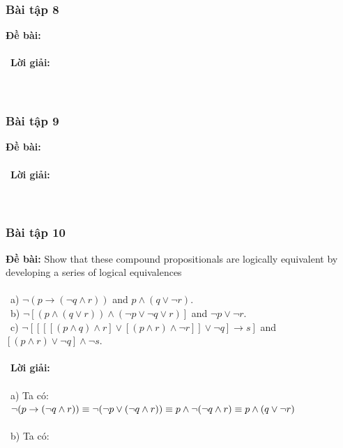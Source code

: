 \documentclass[a4paper]{article}
\begin{document}
\subsubsection{Bài tập 8}
\textbf{Đề bài:} 
\\\ \\\
\textbf{Lời giải:} \\\ \\\
\clearpage
\subsubsection{Bài tập 9}
\textbf{Đề bài:} 
\\\ \\\
\textbf{Lời giải:} \\\ \\\
\clearpage
\subsubsection{Bài tập 10}
\textbf{Đề bài: } Show that these compound propositionals are logically equivalent by developing a series of logical equivalences \\\ \\\
a) $\lnot(p\rightarrow (\lnot q \land r))$ and $p \land (q \lor \lnot r)$.\\\
b) $\lnot[(p \land (q\lor r)) \land (\lnot p \lor \lnot q \lor r)]$ and $\lnot p \lor \lnot r$. \\\
c) $\lnot [[[[(p \land q)\land r] \lor [(p \land r) \land \lnot r]] \lor \lnot q] \rightarrow s]$ and $[(p \land r) \lor \lnot q] \land \lnot s$. \\\ \\\
\textbf{Lời giải:} \\\ \\\
a) Ta có: \\\
$\lnot(p\rightarrow (\lnot q \land r)) \\\equiv \lnot(\lnot p \lor(\lnot q \land r)) \\\equiv p \land \lnot (\lnot q \land r) \\\equiv p \land (q \lor \lnot r)$ \\\ \\\
b) Ta có: \\\
\end{document}
